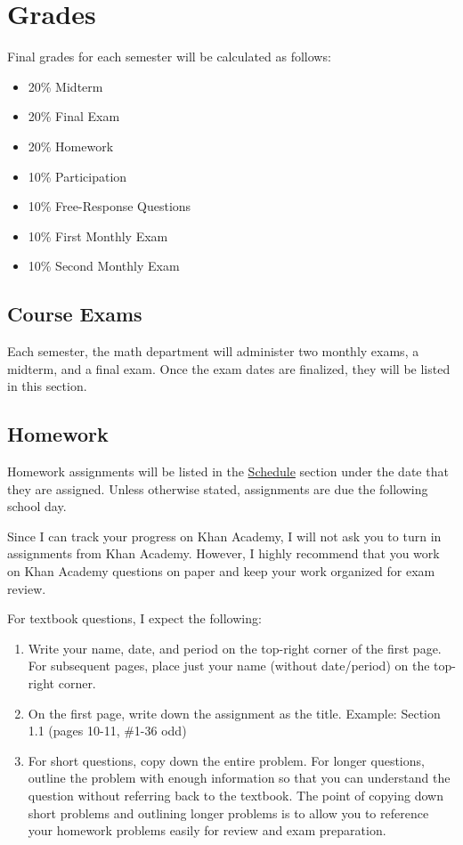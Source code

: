 \documentclass[12pt,fleqn]{article}
\providecommand{\tightlist}{%
  \setlength{\itemsep}{0pt}\setlength{\parskip}{0pt}}
\begin{document}
\hypertarget{grades}{%
\section{Grades}\label{grades}}

Final grades for each semester will be calculated as follows:

\begin{itemize}
\tightlist
\item
  20\% Midterm
\item
  20\% Final Exam
\item
  20\% Homework
\item
  10\% Participation
\item
  10\% Free-Response Questions
\item
  10\% First Monthly Exam
\item
  10\% Second Monthly Exam
\end{itemize}

\hypertarget{course-exams}{%
\subsection{Course Exams}\label{course-exams}}

Each semester, the math department will administer two monthly exams, a midterm, and a final exam. Once the exam dates are finalized, they will be listed in this section.

\hypertarget{homework}{%
\subsection{Homework}\label{homework}}

Homework assignments will be listed in the \protect\hyperlink{sch}{Schedule} section under the date that they are assigned. Unless otherwise stated, assignments are due the following school day.

Since I can track your progress on Khan Academy, I will not ask you to turn in assignments from Khan Academy. However, I highly recommend that you work on Khan Academy questions on paper and keep your work organized for exam review.

For textbook questions, I expect the following:

\begin{enumerate}
\def\labelenumi{\arabic{enumi}.}
\item
  Write your name, date, and period on the top-right corner of the first page. For subsequent pages, place just your name (without date/period) on the top-right corner.
\item
  On the first page, write down the assignment as the title. Example: Section 1.1 (pages 10-11, \#1-36 odd)
\item
  For short questions, copy down the entire problem. For longer questions, outline the problem with enough information so that you can understand the question without referring back to the textbook. The point of copying down short problems and outlining longer problems is to allow you to reference your homework problems easily for review and exam preparation.
\end{enumerate}
\end{document}
